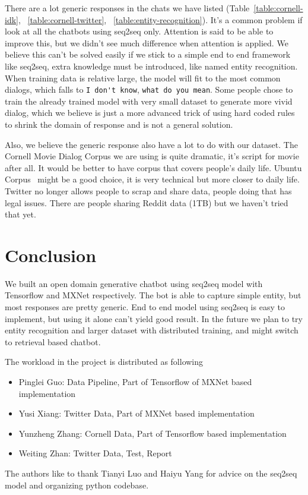 \documentclass{article}
\begin{document}
There are a lot generic responses in the chats we have listed (Table~\ref{table:cornell-idk}, ~\ref{table:cornell-twitter}, ~\ref{table:entity-recognition}).
It's a common problem if look at all the chatbots using seq2seq only.
Attention is said to be able to improve this, but we didn't see much difference when attention is applied.
We believe this can't be solved easily if we stick to a simple end to end framework like seq2seq,
extra knowledge must be introduced, like named entity recognition.
When training data is relative large, the model will fit to the most common dialogs, which falls to \verb+I don't know+,
\verb+what do you mean+.
Some people chose to train the already trained model with very small dataset to generate more vivid dialog,
which we believe is just a more advanced trick of using hard coded rules to shrink the domain of response and is not a general solution.

Also, we believe the generic response also have a lot to do with our dataset.
The Cornell Movie Dialog Corpus we are using is quite dramatic, it's script for movie after all.
It would be better to have corpus that covers people's daily life.
Ubuntu Corpus~\cite{lowe2015ubuntu} might be a good choice, it is very technical but more closer to daily life.
Twitter no longer allows people to scrap and share data, people doing that has legal issues.
There are people sharing Reddit data (1TB) but we haven't tried that yet.


\section{Conclusion}
\label{sec:conclusion}

We built an open domain generative chatbot using seq2seq model with Tensorflow and MXNet respectively.
The bot is able to capture simple entity, but most responses are pretty generic.
End to end model using seq2seq is easy to implement, but using it alone can't yield good result.
In the future we plan to try entity recognition and larger dataset with distributed training,
and might switch to retrieval based chatbot.

The workload in the project is distributed as following

\begin{itemize}
    \item Pinglei Guo: Data Pipeline, Part of Tensorflow of MXNet based implementation
    \item Yusi Xiang: Twitter Data, Part of MXNet based implementation
    \item Yunzheng Zhang: Cornell Data, Part of Tensorflow based implementation
    \item Weiting Zhan: Twitter Data, Test, Report
\end{itemize}

The authors like to thank Tianyi Luo and Haiyu Yang for advice on the seq2seq model and organizing python codebase.

\printbibliography

\end{document}
